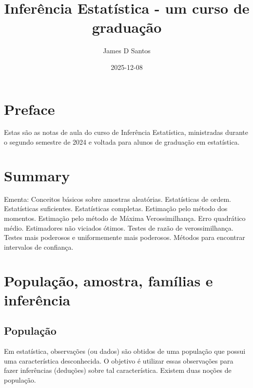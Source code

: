 \documentclass[
  letterpaper,
  DIV=11,
  numbers=noendperiod]{scrartcl}
\title{Inferência Estatística - um curso de graduação}
\author{James D Santos}
\date{2025-12-08}
\renewcommand*\contentsname{Table of contents}
\newcommand\contentsname{Table of contents}
\begin{document}
\maketitle

\renewcommand*\contentsname{Table of contents}
{
\hypersetup{linkcolor=}
\setcounter{tocdepth}{2}
\tableofcontents
}


\chapter*{Preface}\label{preface}


Estas são as notas de aula do curso de Inferência Estatística,
ministradas durante o segundo semestre de 2024 e voltada para alunos de
graduação em estatística.


\chapter{Summary}\label{summary}

Ementa: Conceitos básicos sobre amostras aleatórias. Estatísticas de
ordem. Estatísticas suficientes. Estatísticas completas. Estimação pelo
método dos momentos. Estimação pelo método de Máxima Verossimilhança.
Erro quadrático médio. Estimadores não viciados ótimos. Testes de razão
de verossimilhança. Testes mais poderosos e uniformemente mais
poderosos. Métodos para encontrar intervalos de confiança.


\chapter{População, amostra, famílias e
inferência}\label{populauxe7uxe3o-amostra-famuxedlias-e-inferuxeancia}

\section{População}\label{populauxe7uxe3o}

Em estatística, observações (ou dados) são obtidos de uma população que
possui uma característica desconhecida. O objetivo é utilizar essas
observações para fazer inferências (deduções) sobre tal característica.
Existem duas noções de população.
\end{document}
